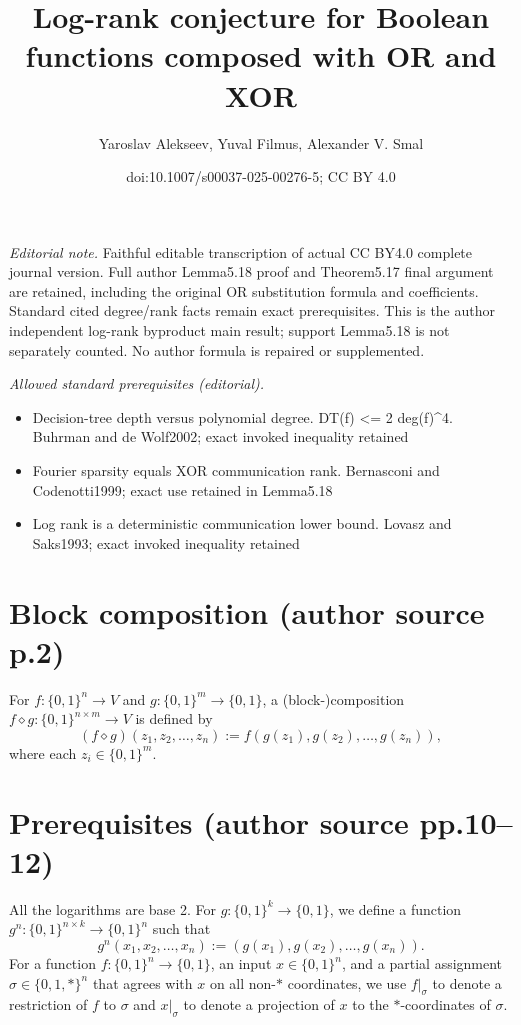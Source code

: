 \documentclass[10pt,a4paper]{article}
\title{Log-rank conjecture for Boolean functions composed with OR and XOR}
\author{Yaroslav Alekseev, Yuval Filmus, Alexander V. Smal}
\date{doi:10.1007/s00037-025-00276-5; CC BY 4.0}
\newcommand{\bits}{\{0,1\}}
\newcommand{\comp}{\diamond}
\begin{document}
\maketitle
\noindent\textit{Editorial note.} Faithful editable transcription of actual CC BY4.0 complete journal version. Full author Lemma5.18 proof and Theorem5.17 final argument are retained, including the original OR substitution formula and coefficients. Standard cited degree/rank facts remain exact prerequisites. This is the author independent log-rank byproduct main result; support Lemma5.18 is not separately counted. No author formula is repaired or supplemented.\par\medskip
\noindent\textit{Allowed standard prerequisites (editorial).}\begin{itemize}
\item Decision-tree depth versus polynomial degree. DT(f) <= 2 deg(f)\textasciicircum{}4. Buhrman and de Wolf2002; exact invoked inequality retained
\item Fourier sparsity equals XOR communication rank. Bernasconi and Codenotti1999; exact use retained in Lemma5.18
\item Log rank is a deterministic communication lower bound. Lovasz and Saks1993; exact invoked inequality retained
\end{itemize}\medskip
\section*{Block composition (author source p.2)}
For $f:\bits^n\to V$ and $g:\bits^m\to\bits$, a (block-)composition $f\comp g:\bits^{n\times m}\to V$ is defined by
\[(f\comp g)(z_1,z_2,\ldots,z_n):=f(g(z_1),g(z_2),\ldots,g(z_n)),\]
where each $z_i\in\bits^m$.
\section*{Prerequisites (author source pp.10--12)}
All the logarithms are base 2. For $g:\bits^k\to\bits$, we define a function $g^n:\bits^{n\times k}\to\bits^n$ such that
\[g^n(x_1,x_2,\ldots,x_n):=(g(x_1),g(x_2),\ldots,g(x_n)).\]
For a function $f:\bits^n\to\bits$, an input $x\in\bits^n$, and a partial assignment $\sigma\in\{0,1,*\}^n$ that agrees with $x$ on all non-$*$ coordinates, we use $f|_\sigma$ to denote a restriction of $f$ to $\sigma$ and $x|_\sigma$ to denote a projection of $x$ to the $*$-coordinates of $\sigma$.
\end{document}
